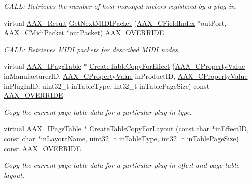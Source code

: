 \begin{DoxyCompactItemize}
\begin{DoxyCompactList}\small\item\em C\+A\+L\+L\+: Retrieves the number of host-\/managed meters registered by a plug-\/in. \end{DoxyCompactList}\item 
virtual \hyperlink{a00149_a4d8f69a697df7f70c3a8e9b8ee130d2f}{A\+A\+X\+\_\+\+Result} \hyperlink{a00132_a15c635e2a6604648bc75cd8f912e641c}{Get\+Next\+M\+I\+D\+I\+Packet} (\hyperlink{a00149_ae807f8986143820cfb5d6da32165c9c7}{A\+A\+X\+\_\+\+C\+Field\+Index} $\ast$out\+Port, \hyperlink{a00024}{A\+A\+X\+\_\+\+C\+Midi\+Packet} $\ast$out\+Packet) \hyperlink{a00149_ac2f24a5172689ae684344abdcce55463}{A\+A\+X\+\_\+\+O\+V\+E\+R\+R\+I\+D\+E}
\begin{DoxyCompactList}\small\item\em C\+A\+L\+L\+: Retrieves M\+I\+D\+I packets for described M\+I\+D\+I nodes. \end{DoxyCompactList}\item 
virtual \hyperlink{a00107}{A\+A\+X\+\_\+\+I\+Page\+Table} $\ast$ \hyperlink{a00132_a792b5d6b9d8354e3f6291cfb6ea3b080}{Create\+Table\+Copy\+For\+Effect} (\hyperlink{a00149_ab247c0d8686c14e05cbb567ef276f249}{A\+A\+X\+\_\+\+C\+Property\+Value} in\+Manufacturer\+I\+D, \hyperlink{a00149_ab247c0d8686c14e05cbb567ef276f249}{A\+A\+X\+\_\+\+C\+Property\+Value} in\+Product\+I\+D, \hyperlink{a00149_ab247c0d8686c14e05cbb567ef276f249}{A\+A\+X\+\_\+\+C\+Property\+Value} in\+Plug\+In\+I\+D, uint32\+\_\+t in\+Table\+Type, int32\+\_\+t in\+Table\+Page\+Size) const \hyperlink{a00149_ac2f24a5172689ae684344abdcce55463}{A\+A\+X\+\_\+\+O\+V\+E\+R\+R\+I\+D\+E}
\begin{DoxyCompactList}\small\item\em Copy the current page table data for a particular plug-\/in type. \end{DoxyCompactList}\item 
virtual \hyperlink{a00107}{A\+A\+X\+\_\+\+I\+Page\+Table} $\ast$ \hyperlink{a00132_a997e7aecbf23facf4768affabed1e6fe}{Create\+Table\+Copy\+For\+Layout} (const char $\ast$in\+Effect\+I\+D, const char $\ast$in\+Layout\+Name, uint32\+\_\+t in\+Table\+Type, int32\+\_\+t in\+Table\+Page\+Size) const \hyperlink{a00149_ac2f24a5172689ae684344abdcce55463}{A\+A\+X\+\_\+\+O\+V\+E\+R\+R\+I\+D\+E}
\begin{DoxyCompactList}\small\item\em Copy the current page table data for a particular plug-\/in effect and page table layout. \end{DoxyCompactList}\item 

\end{DoxyCompactItemize}
